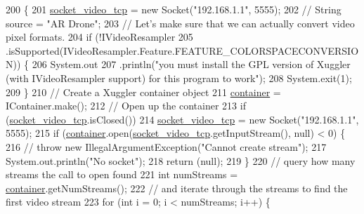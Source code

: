 \begin{DoxyCode}
200                                                                      \{
201         \hyperlink{classworkspace_1_1_a_r_drone_capture_image_1_1src_1_1_drone_tools_ad054763d0e94e8aaed861475c641c42c}{socket\_video\_tcp} = \textcolor{keyword}{new} Socket(\textcolor{stringliteral}{"192.168.1.1"}, 5555);
202         \textcolor{comment}{// String source = "AR Drone";}
203         \textcolor{comment}{// Let's make sure that we can actually convert video pixel formats.}
204         \textcolor{keywordflow}{if} (!IVideoResampler
205                 .isSupported(IVideoResampler.Feature.FEATURE\_COLORSPACECONVERSION)) \{
206             System.out
207                     .println(\textcolor{stringliteral}{"you must install the GPL version of Xuggler (with IVideoResampler support)
       for this program to work"});
208             System.exit(1);
209         \}
210         \textcolor{comment}{// Create a Xuggler container object}
211         \hyperlink{classworkspace_1_1_a_r_drone_capture_image_1_1src_1_1_drone_tools_a1c1b1c9966fa3b80bb679d60c9b93c4d}{container} = IContainer.make();
212         \textcolor{comment}{// Open up the container}
213         \textcolor{keywordflow}{if} (\hyperlink{classworkspace_1_1_a_r_drone_capture_image_1_1src_1_1_drone_tools_ad054763d0e94e8aaed861475c641c42c}{socket\_video\_tcp}.isClosed())
214             \hyperlink{classworkspace_1_1_a_r_drone_capture_image_1_1src_1_1_drone_tools_ad054763d0e94e8aaed861475c641c42c}{socket\_video\_tcp} = \textcolor{keyword}{new} Socket(\textcolor{stringliteral}{"192.168.1.1"}, 5555);
215         \textcolor{keywordflow}{if} (\hyperlink{classworkspace_1_1_a_r_drone_capture_image_1_1src_1_1_drone_tools_a1c1b1c9966fa3b80bb679d60c9b93c4d}{container}.open(\hyperlink{classworkspace_1_1_a_r_drone_capture_image_1_1src_1_1_drone_tools_ad054763d0e94e8aaed861475c641c42c}{socket\_video\_tcp}.getInputStream(), null) < 0) \{
216             \textcolor{comment}{// throw new IllegalArgumentException("Cannot create stream");}
217             System.out.println(\textcolor{stringliteral}{"No socket"});
218             \textcolor{keywordflow}{return} (null);
219         \}
220         \textcolor{comment}{// query how many streams the call to open found}
221         \textcolor{keywordtype}{int} numStreams = \hyperlink{classworkspace_1_1_a_r_drone_capture_image_1_1src_1_1_drone_tools_a1c1b1c9966fa3b80bb679d60c9b93c4d}{container}.getNumStreams();
222         \textcolor{comment}{// and iterate through the streams to find the first video stream}
223         \textcolor{keywordflow}{for} (\textcolor{keywordtype}{int} i = 0; i < numStreams; i++) \{

\end{DoxyCode}
